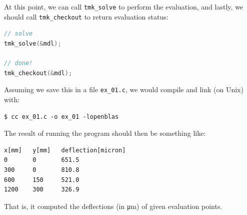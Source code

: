 \documentclass{article}
\begin{document}
At this point, we can call \texttt{tmk\_solve} to perform the evaluation, and lastly, we should call \texttt{tmk\_checkout} to return evaluation status:
\begin{file}[ex\_01.c]
\begin{lstlisting}[language=C]
// solve
tmk_solve(&mdl);

// done!
tmk_checkout(&mdl);
\end{lstlisting}
\end{file}

Assuming we save this in a file \texttt{ex\_01.c}, we would compile and link (on Unix) with:
\begin{commandline}
\begin{verbatim}
$ cc ex_01.c -o ex_01 -lopenblas
\end{verbatim}
\end{commandline}

The result of running the program should then be something like:
\begin{commandline}
\begin{verbatim}
x[mm]   y[mm]   deflection[micron]
0       0       651.5
300     0       810.8
600     150     521.0
1200    300     326.9
\end{verbatim}
\end{commandline}

That is, it computed the deflections (in \si{\micro\meter}) of given evaluation points.
\end{document}
